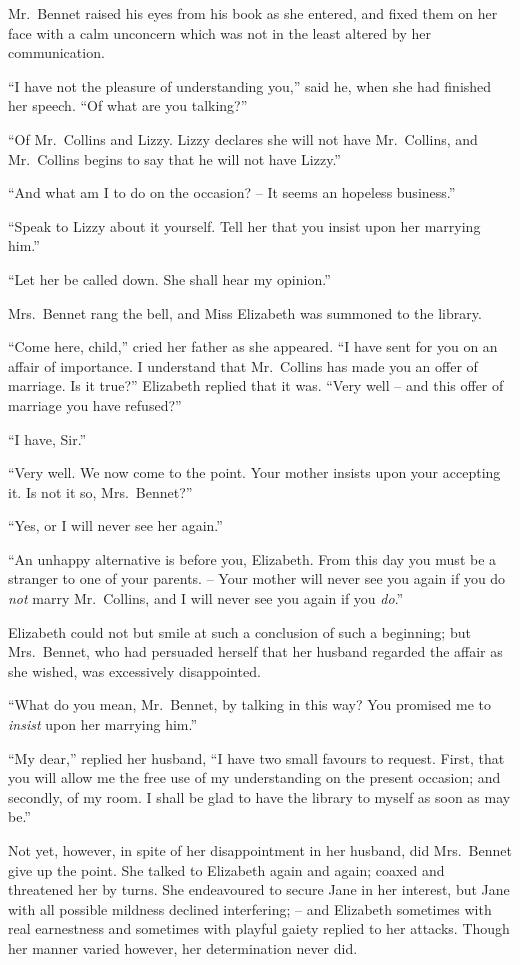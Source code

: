 Mr.\ Bennet raised his eyes from his book as she entered,
and fixed them on her face with a calm unconcern which
was not in the least altered by her communication.

“I have not the pleasure of understanding you,” said
he, when she had finished her speech. “Of what are you
talking?”

“Of Mr.\ Collins and Lizzy. Lizzy declares she will not
have Mr.\ Collins, and Mr.\ Collins begins to say that he
will not have Lizzy.”

“And what am I to do on the occasion? -- It seems an
hopeless business.”

“Speak to Lizzy about it yourself. Tell her that you
insist upon her marrying him.”

“Let her be called down. She shall hear my opinion.”

Mrs.\ Bennet rang the bell, and Miss Elizabeth was
summoned to the library.

“Come here, child,” cried her father as she appeared.
“I have sent for you on an affair of importance. I understand
that Mr.\ Collins has made you an offer of marriage.
Is it true?” Elizabeth replied that it was. “Very well -- and
this offer of marriage you have refused?”

“I have, Sir.”

“Very well. We now come to the point. Your mother
insists upon your accepting it. Is not it so, Mrs.\ Bennet?”

“Yes, or I will never see her again.”

“An unhappy alternative is before you, Elizabeth.
From this day you must be a stranger to one of your
parents. -- Your mother will never see you again if you
do \textit{not} marry Mr.\ Collins, and I will never see you again
if you \textit{do}.”

Elizabeth could not but smile at such a conclusion of
such a beginning; but Mrs.\ Bennet, who had persuaded
herself that her husband regarded the affair as she wished,
was excessively disappointed.

“What do you mean, Mr.\ Bennet, by talking in this
way? You promised me to \textit{insist} upon her marrying him.”

“My dear,” replied her husband, “I have two small
favours to request. First, that you will allow me the free
use of my understanding on the present occasion; and
secondly, of my room. I shall be glad to have the library
to myself as soon as may be.”

Not yet, however, in spite of her disappointment in her
husband, did Mrs.\ Bennet give up the point. She talked
to Elizabeth again and again; coaxed and threatened her
by turns. She endeavoured to secure Jane in her interest,
but Jane with all possible mildness declined interfering; -- and
Elizabeth sometimes with real earnestness and sometimes
with playful gaiety replied to her attacks. Though
her manner varied however, her determination never did.


